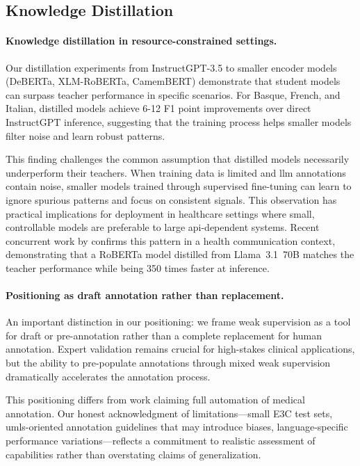 \subsection{Knowledge Distillation}
\paragraph{Knowledge distillation in resource-constrained settings.}

Our distillation experiments from InstructGPT-3.5 to smaller encoder models (DeBERTa, XLM-RoBERTa, CamemBERT) demonstrate that student models can surpass teacher performance in specific scenarios.
For Basque, French, and Italian, distilled models achieve 6-12 F1 point improvements over direct InstructGPT inference, suggesting that the training process helps smaller models filter noise and learn robust patterns.

This finding challenges the common assumption that distilled models necessarily underperform their teachers.
When training data is limited and \gls{llm} annotations contain noise, smaller models trained through supervised fine-tuning can learn to ignore spurious patterns and focus on consistent signals.
This observation has practical implications for deployment in healthcare settings where small, controllable models are preferable to large \gls{api}-dependent systems.
Recent concurrent work by \citet{khan2026efficient} confirms this pattern in a health communication context, demonstrating that a RoBERTa model distilled from Llama~3.1~70B matches the teacher performance while being 350 times faster at inference.

\paragraph{Positioning as draft annotation rather than replacement.}

An important distinction in our positioning: we frame weak supervision as a tool for draft or pre-annotation rather than a complete replacement for human annotation.
Expert validation remains crucial for high-stakes clinical applications, but the ability to pre-populate annotations through mixed weak supervision dramatically accelerates the annotation process.

This positioning differs from work claiming full automation of medical annotation.
Our honest acknowledgment of limitations—small E3C test sets, \gls{umls}-oriented annotation guidelines that may introduce biases, language-specific performance variations—reflects a commitment to realistic assessment of capabilities rather than overstating claims of generalization.

